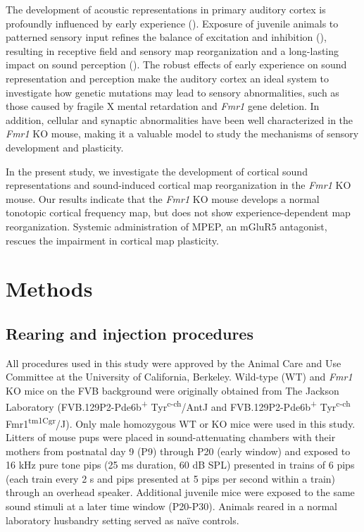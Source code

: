 The development of acoustic representations in primary auditory cortex is profoundly influenced by early experience (\cite{Zhang2001, DeVillers-Sidani2007, Insanally2009, Popescu2010a}). Exposure of juvenile animals to patterned sensory input refines the balance of excitation and inhibition (\cite{Dorrn2010, Sun2010}), resulting in receptive field and sensory map reorganization and a long-lasting impact on sound perception (\cite{Han2007}). The robust effects of early experience on sound representation and perception make the auditory cortex an ideal system to investigate how genetic mutations may lead to sensory abnormalities, such as those caused by fragile X mental retardation and \textit{Fmr1} gene deletion. In addition, cellular and synaptic abnormalities have been well characterized in the \textit{Fmr1} KO mouse, making it a valuable model to study the mechanisms of sensory development and plasticity.

In the present study, we investigate the development of cortical sound representations and sound-induced cortical map reorganization in the \textit{Fmr1} KO mouse. Our results indicate that the \textit{Fmr1} KO mouse develops a normal tonotopic cortical frequency map, but does not show experience-dependent map reorganization. Systemic administration of MPEP, an mGluR5 antagonist, rescues the impairment in cortical map plasticity.

\section{Methods}

\subsection{Rearing and injection procedures}

All procedures used in this study were approved by the Animal Care and Use Committee at the University of California, Berkeley. Wild-type (WT) and \textit{Fmr1} KO mice on the FVB background were originally obtained from The Jackson Laboratory (FVB.129P2-Pde6b\textsuperscript{+} Tyr\textsuperscript{c-ch}/AntJ and FVB.129P2-Pde6b\textsuperscript{+} Tyr\textsuperscript{c-ch} Fmr1\textsuperscript{tm1Cgr}/J). Only male homozygous WT or KO mice were used in this study. Litters of mouse pups were placed in sound-attenuating chambers with their mothers from postnatal day 9 (P9) through P20 (early window) and exposed to 16 kHz pure tone pips (25 ms duration, 60 dB SPL) presented in trains of 6 pips (each train every 2 s and pips presented at 5 pips per second within a train) through an overhead speaker. Additional juvenile mice were exposed to the same sound stimuli at a later time window (P20-P30). Animals reared in a normal laboratory husbandry setting served as na\"ive controls.

